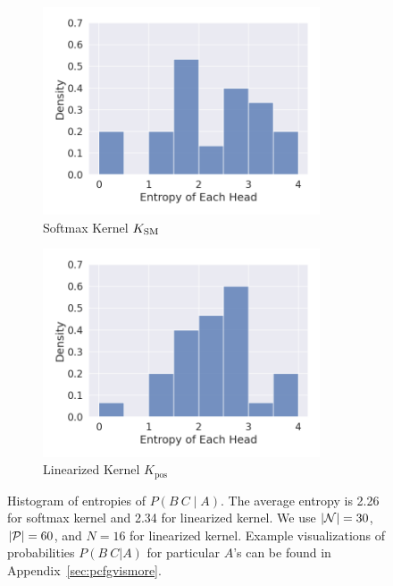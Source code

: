 \documentclass{article}
\begin{document}
\begin{figure}[!htp]
  \centering
  \begin{subfigure}[t]{0.45\textwidth}
  \centering
  \includegraphics[width=0.9\textwidth]{imgs/softmax/entropy.png}
  \caption{Softmax Kernel $K_{\mathrm{SM}}$}
  \end{subfigure}
  \begin{subfigure}[t]{0.45\textwidth}
  \centering
  \includegraphics[width=0.9\textwidth]{imgs/rff/entropy.png}
  \caption{Linearized Kernel $K_{\textrm{pos}}$}
  \end{subfigure}
  \caption{\label{fig:example_production}Histogram of entropies of $P(B\ C\mid A)$. The average entropy is 2.26 for softmax kernel and 2.34 for linearized kernel. We use $|\mathcal{N}|=30$, $|\mathcal{P}|=60$, and $N=16$ for linearized kernel. Example visualizations of probabilities $P(B\ C|A)$ for particular $A$'s can be found in Appendix~\ref{sec:pcfgvismore}.}
\end{figure}
\end{document}
